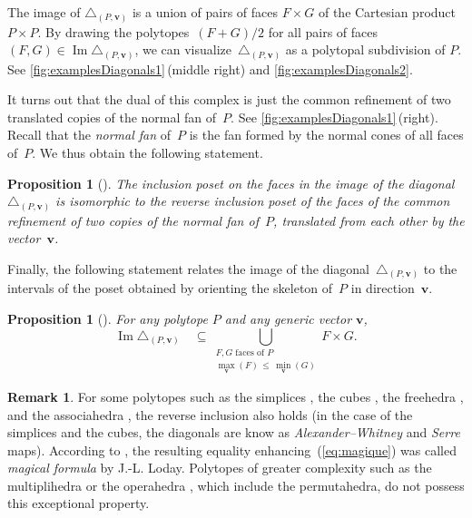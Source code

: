 \documentclass{amsart}
\newcommand{\darkblue}{\color{darkblue}} %
\newtheorem{proposition}[theorem]{Proposition}
\theoremstyle{definition}
\newtheorem{remark}[theorem]{Remark}
\renewcommand{\b}[1]{{\boldsymbol{#1}}} %
\DeclareMathOperator{\Ima}{Im} %
\newcommand{\defn}[1]{\textsl{\darkblue #1}} %
\renewcommand{\b}[1]{\boldsymbol{#1}} %
\begin{document}
The image of $\triangle_{(P,\b{v})}$ is a union of pairs of faces $F \times G$ of the Cartesian product~$P \times P$.
By drawing the polytopes~${(F+G)/2}$ for all pairs of faces $(F,G) \in \Ima \triangle_{(P,\b{v})}$, we can visualize~$\triangle_{(P,\b{v})}$ as a polytopal subdivision of $P$.
See \cref{fig:examplesDiagonals1}\,(middle right) and \cref{fig:examplesDiagonals2}.

It turns out that the dual of this complex is just the common refinement of two translated copies of the normal fan of~$P$.
See \cref{fig:examplesDiagonals1}\,(right).
Recall that the \defn{normal fan} of~$P$ is the fan formed by the normal cones of all faces of~$P$.
We thus obtain the following statement.

\begin{proposition}[{\cite[Coro.~1.4]{LaplanteAnfossi}}]
\label{prop:diagonalCommonRefinement}
The inclusion poset on the faces in the image of the diagonal~$\triangle_{(P,\b{v})}$ is isomorphic to the reverse inclusion poset of the faces of the common refinement of two copies of the normal fan of~$P$, translated from each other by the vector~$\b{v}$. 
\end{proposition}

Finally, the following statement relates the image of the diagonal~$\triangle_{(P, \b{v})}$ to the intervals of the poset obtained by orienting the skeleton of~$P$ in direction~$\b{v}$.

\begin{proposition}[{\cite[Prop. 1.17]{LaplanteAnfossi}}]
\label{prop:magicalFormula}
For any polytope $P$ and any generic vector $\b{v}$,
\begin{equation}
\label{eq:magique}
\Ima\triangle_{(P, \b{v})} \quad \subseteq \bigcup_{\substack{F,G \text{ faces of } P \\ \max_{\b{v}}(F) \, \le \, \min_{\b{v}}(G)}} F \times G .
\end{equation}
\end{proposition}

\begin{remark}
For some polytopes such as the simplices \cite{EilenbergMacLane}, the cubes \cite{Serre}, the freehedra \cite{Saneblidze-freeLoopFibration}, and the associahedra \cite{MasudaThomasTonksVallette}, the reverse inclusion also holds (in the case of the simplices and the cubes, the diagonals are know as \emph{Alexander--Whitney} and \emph{Serre} maps).
According to \cite{MasudaThomasTonksVallette}, the resulting equality enhancing~(\ref{eq:magique}) was called \defn{magical formula} by J.-L. Loday.
Polytopes of greater complexity such as the multiplihedra \cite{LaplanteAnfossiMazuir} or the operahedra \cite{LaplanteAnfossi}, which include the permutahedra, do not possess this exceptional property. 
\end{remark}
\end{document}
